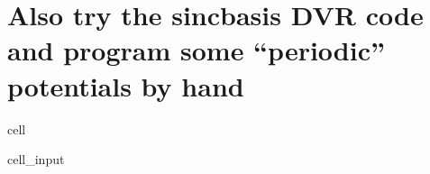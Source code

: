 \documentclass[letterpaper,10pt,english]{jupyterBook}
\begin{document}
\section{Also try the sinc\sphinxhyphen{}basis DVR code and program some “periodic” potentials by hand}
\label{\detokenize{Section6:also-try-the-sinc-basis-dvr-code-and-program-some-periodic-potentials-by-hand}}
\begin{sphinxuseclass}{cell}\begin{sphinxVerbatimInput}

\begin{sphinxuseclass}{cell_input}
\begin{sphinxVerbatim}[commandchars=\\\{\}]
  
  
\end{sphinxVerbatim}

\end{sphinxuseclass}\end{sphinxVerbatimInput}

\end{sphinxuseclass}
\end{document}
